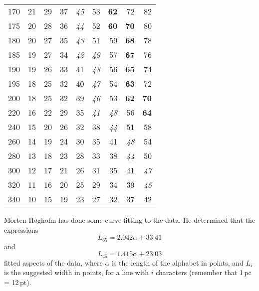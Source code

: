 \documentclass[10pt,letterpaper,extrafontsizes]{memoir}
\newcommand\U[2]{\textrm{#1}\,\textrm{#2}}
\begin{document}
\begin{table}
\begin{tabular}{r|rrrrrrrr}
170  & 21 & 29 & 37 & \textit{45} & 53 & \textbf{62} & 72 & 82 \\
175  & 20 & 28 & 36 & \textit{44} & 52 & \textbf{60} & \textbf{70} & 80 \\
180  & 20 & 27 & 35 & \textit{43} & 51 & 59 & \textbf{68} & 78 \\
185  & 19 & 27 & 34 & \textit{42} & \textit{49} & 57 & \textbf{67} & 76 \\
190  & 19 & 26 & 33 & 41 & \textit{48} & 56 & \textbf{65} & 74 \\
195  & 18 & 25 & 32 & 40 & \textit{47} & 54 & \textbf{63} & 72 \\
200  & 18 & 25 & 32 & 39 & \textit{46} & 53 & \textbf{62} & \textbf{70} \\ 
220  & 16 & 22 & 29 & 35 & \textit{41} & \textit{48} & 56 & \textbf{64} \\
240  & 15 & 20 & 26 & 32 & 38 & \textit{44} & 51 & 58 \\
260  & 14 & 19 & 24 & 30 & 35 & 41 & \textit{48} & 54 \\
280  & 13 & 18 & 23 & 28 & 33 & 38 & \textit{44} & 50 \\
300  & 12 & 17 & 21 & 26 & 31 & 35 & 41 & \textit{47} \\
320  & 11 & 16 & 20 & 25 & 29 & 34 & 39 & \textit{45} \\
340  & 10 & 15 & 19 & 23 & 27 & 32 & 37 & 42 \\
\hline
\end{tabular}
\end{table}

    Morten H{\o}gholm has done some curve fitting
to the data. He determined that the expressions
\begin{equation}
L_{65} = 2.042\alpha + 33.41 \label{eq:L65}
\end{equation}
and
\begin{equation}
L_{45} = 1.415\alpha + 23.03 \label{eq:L45}
\end{equation}
fitted aspects of the data, where $\alpha$ is the length of the alphabet
in points, and $L_{i}$ is the suggested width in points, for a line with
$i$ characters (remember that \U{1}{pc} = \U{12}{pt}).
\end{document}
